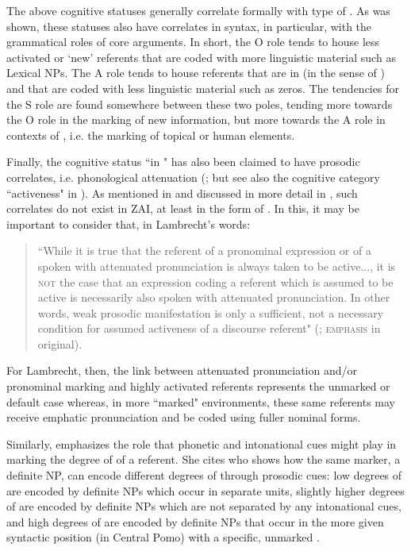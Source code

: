 The above cognitive statuses generally correlate formally with type of . As was shown, these statuses also have correlates in syntax, in particular, with the grammatical roles of core arguments. In short, the O role tends to house less activated or `new' referents that are coded with more linguistic material such as Lexical NPs. The A role tends to house referents that are in  (in the sense of \citealt{gundel1993}) and that are coded with less linguistic material such as zeros. The tendencies for the S role are found somewhere between these two poles, tending more towards the O role in the marking of new information, but more towards the A role in contexts of , i.e. the marking of topical or human elements. 

Finally, the cognitive status ``in " has also been claimed to have prosodic correlates, i.e. phonological attenuation (\citealt[285]{gundel1993}; but see also the cognitive category ``activeness" in \citealt{lambrecht1994,ariel1990,ariel2001}). As mentioned in  and discussed in more detail in , such correlates do not exist in ZAI, at least in the form of . In this, it may be important to consider that, in Lambrecht's words:

\begin{quote} ``While it is true that the referent of a pronominal expression or of a  spoken with attenuated pronunciation is always taken to be active..., it is \textsc{not} the case that an expression coding a referent which is assumed to be active is necessarily also spoken with attenuated pronunciation. In other words, weak prosodic manifestation is only a sufficient, not a necessary condition for assumed activeness of a discourse referent" (\citealt[97]{lambrecht1994}; \textsc{emphasis} in original).
\end{quote}
 
For Lambrecht, then, the link between attenuated pronunciation and/or pro\-nom\-i\-nal marking and highly activated referents represents the unmarked or default case whereas, in more ``marked" environments, these same referents may receive emphatic pronunciation and be coded using fuller nominal forms.

Similarly, \citet[50]{ariel2001} emphasizes the role that phonetic and intonational cues might play in marking the degree of  of a referent. She cites \citet{mithun1995} who shows how the same  marker, a definite NP, can encode different degrees of  through prosodic cues: low degrees of  are encoded by definite NPs which occur in separate  units, slightly higher degrees of  are encoded by definite NPs which are not separated by any intonational cues, and high degrees of  are encoded by definite NPs that occur in the more given syntactic position (in Central Pomo) with a specific, unmarked . 


